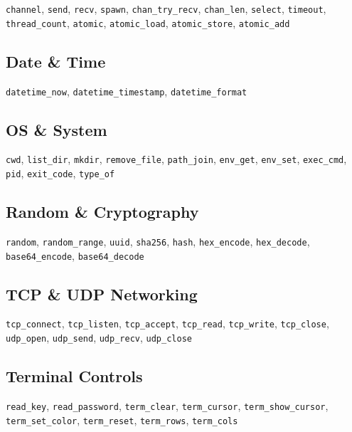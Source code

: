 \documentclass[
  english,
]{book}
\begin{document}
\texttt{channel}, \texttt{send}, \texttt{recv}, \texttt{spawn},
\texttt{chan\_try\_recv}, \texttt{chan\_len}, \texttt{select},
\texttt{timeout}, \texttt{thread\_count}, \texttt{atomic},
\texttt{atomic\_load}, \texttt{atomic\_store}, \texttt{atomic\_add}

\subsection{Date \& Time}\label{date-time}

\texttt{datetime\_now}, \texttt{datetime\_timestamp},
\texttt{datetime\_format}

\subsection{OS \& System}\label{os-system}

\texttt{cwd}, \texttt{list\_dir}, \texttt{mkdir}, \texttt{remove\_file},
\texttt{path\_join}, \texttt{env\_get}, \texttt{env\_set},
\texttt{exec\_cmd}, \texttt{pid}, \texttt{exit\_code}, \texttt{type\_of}

\subsection{Random \& Cryptography}\label{random-cryptography}

\texttt{random}, \texttt{random\_range}, \texttt{uuid}, \texttt{sha256},
\texttt{hash}, \texttt{hex\_encode}, \texttt{hex\_decode},
\texttt{base64\_encode}, \texttt{base64\_decode}

\subsection{TCP \& UDP Networking}\label{tcp-udp-networking}

\texttt{tcp\_connect}, \texttt{tcp\_listen}, \texttt{tcp\_accept},
\texttt{tcp\_read}, \texttt{tcp\_write}, \texttt{tcp\_close},
\texttt{udp\_open}, \texttt{udp\_send}, \texttt{udp\_recv},
\texttt{udp\_close}

\subsection{Terminal Controls}\label{terminal-controls}

\texttt{read\_key}, \texttt{read\_password}, \texttt{term\_clear},
\texttt{term\_cursor}, \texttt{term\_show\_cursor},
\texttt{term\_set\_color}, \texttt{term\_reset}, \texttt{term\_rows},
\texttt{term\_cols}
\end{document}

